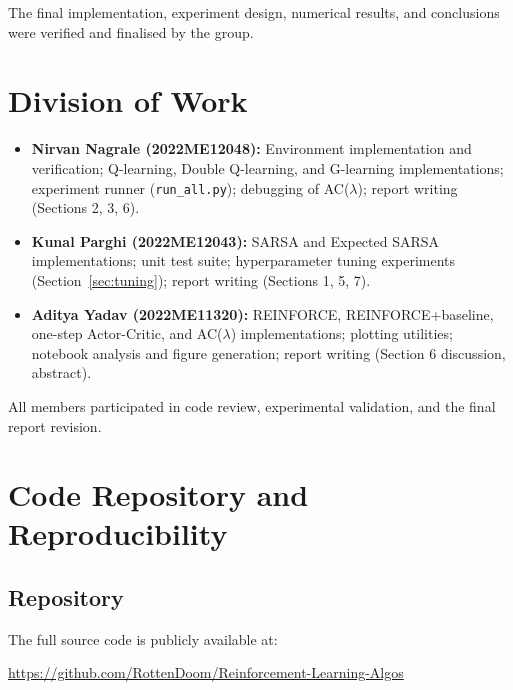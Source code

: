 \documentclass[11pt]{article}
\begin{document}
The final implementation, experiment design, numerical results, and conclusions
were verified and finalised by the group.

\section{Division of Work}

\begin{itemize}[leftmargin=*]
    \item \textbf{Nirvan Nagrale (2022ME12048):} Environment implementation and
        verification; Q-learning, Double Q-learning, and G-learning
        implementations; experiment runner (\texttt{run\_all.py}); debugging of
        AC($\lambda$); report writing (Sections 2, 3, 6).

    \item \textbf{Kunal Parghi (2022ME12043):} SARSA and Expected SARSA
        implementations; unit test suite; hyperparameter tuning experiments
        (Section~\ref{sec:tuning}); report writing (Sections 1, 5, 7).

    \item \textbf{Aditya Yadav (2022ME11320):} REINFORCE, REINFORCE+baseline,
        one-step Actor-Critic, and AC($\lambda$) implementations; plotting
        utilities; notebook analysis and figure generation; report writing
        (Section 6 discussion, abstract).
\end{itemize}

All members participated in code review, experimental validation, and the
final report revision.

\appendix
\section{Code Repository and Reproducibility}
\label{sec:appendix}

\subsection*{Repository}

The full source code is publicly available at:

\begin{center}
    \url{https://github.com/RottenDoom/Reinforcement-Learning-Algos}
\end{center}
\end{document}
